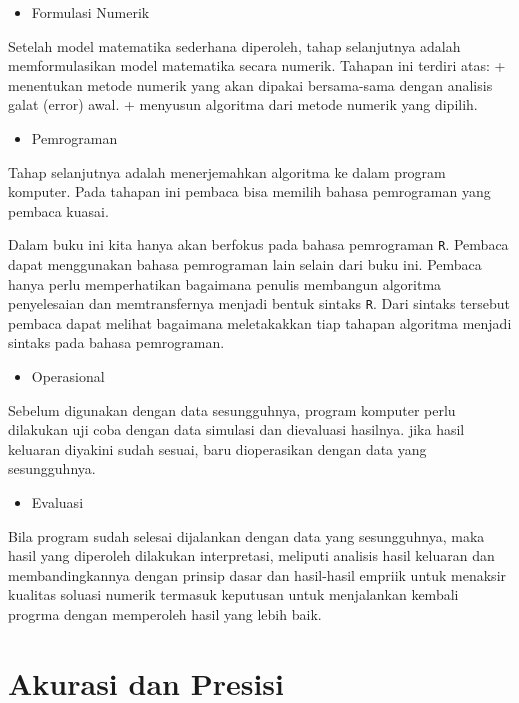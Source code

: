 \documentclass[
]{book}
\providecommand{\tightlist}{%
  \setlength{\itemsep}{0pt}\setlength{\parskip}{0pt}}
\theoremstyle{definition}
\theoremstyle{definition}
\theoremstyle{definition}
\theoremstyle{definition}
\theoremstyle{remark}
\begin{document}
\begin{itemize}
\tightlist
\item
  Formulasi Numerik
\end{itemize}

Setelah model matematika sederhana diperoleh, tahap selanjutnya adalah memformulasikan model matematika secara numerik. Tahapan ini terdiri atas:
+ menentukan metode numerik yang akan dipakai bersama-sama dengan analisis galat (error) awal.
+ menyusun algoritma dari metode numerik yang dipilih.

\begin{itemize}
\tightlist
\item
  Pemrograman
\end{itemize}

Tahap selanjutnya adalah menerjemahkan algoritma ke dalam program komputer. Pada tahapan ini pembaca bisa memilih bahasa pemrograman yang pembaca kuasai.

Dalam buku ini kita hanya akan berfokus pada bahasa pemrograman \texttt{R}. Pembaca dapat menggunakan bahasa pemrograman lain selain dari buku ini. Pembaca hanya perlu memperhatikan bagaimana penulis membangun algoritma penyelesaian dan memtransfernya menjadi bentuk sintaks \texttt{R}. Dari sintaks tersebut pembaca dapat melihat bagaimana meletakakkan tiap tahapan algoritma menjadi sintaks pada bahasa pemrograman.

\begin{itemize}
\tightlist
\item
  Operasional
\end{itemize}

Sebelum digunakan dengan data sesungguhnya, program komputer perlu dilakukan uji coba dengan data simulasi dan dievaluasi hasilnya. jika hasil keluaran diyakini sudah sesuai, baru dioperasikan dengan data yang sesungguhnya.

\begin{itemize}
\tightlist
\item
  Evaluasi
\end{itemize}

Bila program sudah selesai dijalankan dengan data yang sesungguhnya, maka hasil yang diperoleh dilakukan interpretasi, meliputi analisis hasil keluaran dan membandingkannya dengan prinsip dasar dan hasil-hasil empriik untuk menaksir kualitas soluasi numerik termasuk keputusan untuk menjalankan kembali progrma dengan memperoleh hasil yang lebih baik.

\hypertarget{acuracy}{%
\section{Akurasi dan Presisi}\label{acuracy}}
\end{document}
